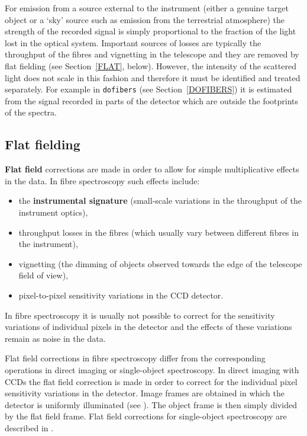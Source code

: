 \documentclass[chapters,twoside,11pt]{starlink}
\begin{document}
For emission from a source external to the instrument (either a
genuine target object or a `sky' source such as emission from the
terrestrial atmosphere) the strength of the recorded signal is simply
proportional to the fraction of the light lost in the optical system.
Important sources of losses are typically the throughput of the fibres
and vignetting in the telescope and they are removed by flat fielding
(see Section~\ref{FLAT}, below).  However, the intensity of the scattered
light does not scale in this fashion and therefore it must be identified
and treated separately.  For example in \texttt{dofibers} (see
Section~\ref{DOFIBERS}) it is estimated from the signal recorded in parts
of the detector which are outside the footprints of the spectra.

\subsection{\label{FLAT}Flat fielding}

\textbf{Flat field} corrections are made in order to allow for simple
multiplicative effects in the data.  In fibre spectroscopy such effects
include:

\begin{itemize}

  \item the \textbf{instrumental signature} (small-scale variations in the
   throughput of the instrument optics),

  \item throughput losses in the fibres (which usually vary between
   different fibres in the instrument),

  \item vignetting (the dimming of objects observed towards the edge of
   the telescope field of view),

  \item pixel-to-pixel sensitivity variations in the CCD detector.

\end{itemize}

In fibre spectroscopy it is usually not possible to correct for the
sensitivity variations of individual pixels in the detector and the
effects of these variations remain as noise in the data.

Flat field corrections in fibre spectroscopy differ from the corresponding
operations in direct imaging or single-object spectroscopy.  In direct
imaging with CCDs the flat field correction is made in order to correct
for the individual pixel sensitivity variations in the detector.  Image
frames are obtained in which the detector is uniformly illuminated
(see ).  The object frame is then simply divided by
the flat field frame.  Flat field corrections for single-object
spectroscopy are described in .
\end{document}
